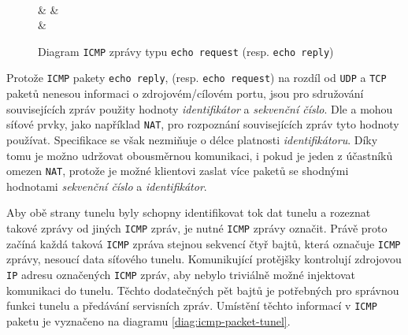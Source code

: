 \documentclass[thesis=M,czech]{FITthesis}[2012/10/20]
\begin{document}
    \begin{figure}[h]
    \centering
	\begin{bytefield}[bitwidth=1em]{32}
	    \\
	     &  & 
	    \\
	     & 
	    \\
	\end{bytefield}
	\caption{Diagram \texttt{ICMP} zprávy typu \texttt{echo request} (resp. \texttt{echo reply})}
	\label{diag:icmp-packet}
    \end{figure}
    
    Protože \texttt{ICMP} pakety \texttt{echo reply}, (resp. \texttt{echo request}) na rozdíl od \texttt{UDP} a \texttt{TCP} paketů nenesou informaci o zdrojovém/cílovém portu, jsou pro sdružování souvisejících zpráv použity hodnoty \textit{identifikátor} a \textit{sekvenční číslo}. Dle \cite[RFC 792]{rfc792} a \cite[RFC 3022]{rfc3022} mohou síťové prvky, jako například \texttt{NAT}, pro rozpoznání souvisejících zpráv tyto hodnoty používat. Specifikace se však nezmiňuje o délce platnosti \textit{identifikátoru}. Díky tomu je možno udržovat obousměrnou komunikaci, i pokud je jeden z účastníků omezen \texttt{NAT}, protože je možné klientovi  zaslat více paketů se shodnými hodnotami \textit{sekvenční číslo} a \textit{identifikátor}.
    
    Aby obě strany tunelu byly schopny identifikovat tok dat tunelu a rozeznat takové zprávy od jiných \texttt{ICMP} zpráv, je nutné  \texttt{ICMP} zprávy označit. Právě proto začíná každá taková \texttt{ICMP} zpráva stejnou sekvencí čtyř bajtů, která označuje \texttt{ICMP} zprávy, nesoucí data síťového tunelu. Komunikující protějšky kontrolují zdrojovou \texttt{IP} adresu označených \texttt{ICMP} zpráv, aby nebylo triviálně možné injektovat komunikaci do tunelu. Těchto dodatečných pět bajtů je potřebných pro správnou funkci tunelu a předávání servisních zpráv. Umístění těchto informací v \texttt{ICMP} paketu je vyznačeno na diagramu \ref{diag:icmp-packet-tunel}.
    
\end{document}
